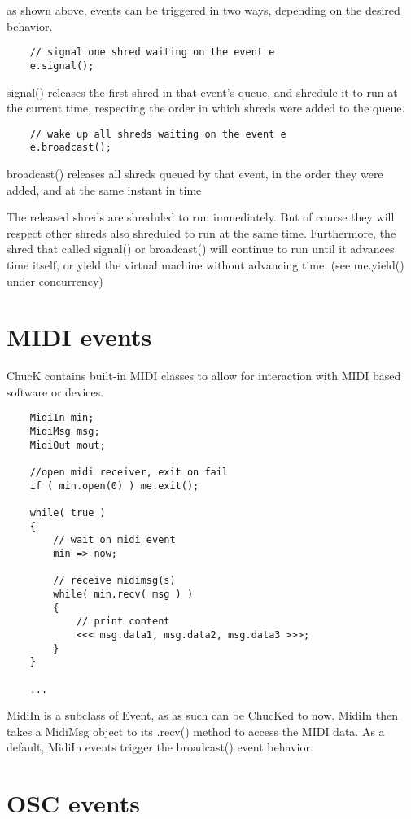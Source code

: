 as shown above, events can be triggered in two ways, depending on the desired behavior.
\begin{verbatim}
    // signal one shred waiting on the event e
    e.signal();
\end{verbatim}

signal() releases the  first shred in that event's queue, and shredule it to run at the current time, respecting the order in which shreds were added to the queue.
\begin{verbatim}
    // wake up all shreds waiting on the event e
    e.broadcast();
\end{verbatim}

broadcast() releases  all shreds queued by that event, in the order they were added, and at the same instant in time

The released shreds are shreduled to run immediately. But of course they will respect other shreds also shreduled to run at the same time. Furthermore, the shred that called signal() or broadcast() will continue to run until it advances time itself, or yield the virtual machine without advancing time. (see me.yield() under concurrency)
 

\section{MIDI events}

ChucK contains built-in MIDI classes to allow for interaction with MIDI based software or devices.
\begin{verbatim}
    MidiIn min;
    MidiMsg msg;
    MidiOut mout;

    //open midi receiver, exit on fail
    if ( min.open(0) ) me.exit(); 

    while( true )
    {
        // wait on midi event
        min => now;

        // receive midimsg(s)
        while( min.recv( msg ) )
        {
            // print content
            <<< msg.data1, msg.data2, msg.data3 >>>;
        }
    }

    ...
\end{verbatim}


MidiIn is a subclass of Event, as as such can be ChucKed to now. MidiIn then takes a MidiMsg object to its  .recv() method to access the MIDI data.
 As a default, MidiIn events trigger the broadcast() event behavior.
 

\section{OSC events}


